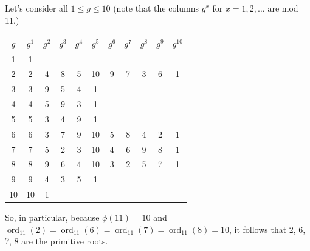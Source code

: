 \documentclass[letterpaper]{article}
\DeclareMathOperator{\ord}{ord}
\begin{document}
\begin{mdframed}
\begin{itemize}
\begin{mdframed}
            \bigskip 

            Let's consider all $1 \leq g \leq 10$ (note that the columns $g^x$ for $x = 1, 2, \hdots$ are mod 11.) 
            \begin{center}
                \begin{tabular}{|c|c c c c c c c c c c|}
                    \hline 
                    $g$ & $g^1$ & $g^2$ & $g^3$ & $g^4$ & $g^5$ & $g^6$ & $g^7$ & $g^8$ & $g^9$ & $g^{10}$ \\ 
                    \hline 
                    1   & 1     &       &       &       &       &       &       &       &       &          \\ 
                    2   & 2     & 4     & 8     & 5     & 10    & 9     & 7     & 3     & 6     & 1        \\ 
                    3   & 3     & 9     & 5     & 4     & 1     &       &       &       &       &          \\ 
                    4   & 4     & 5     & 9     & 3     & 1     &       &       &       &       &          \\ 
                    5   & 5     & 3     & 4     & 9     & 1     &       &       &       &       &          \\ 
                    6   & 6     & 3     & 7     & 9     & 10    & 5     & 8     & 4     & 2     & 1        \\ 
                    7   & 7     & 5     & 2     & 3     & 10    & 4     & 6     & 9     & 8     & 1        \\ 
                    8   & 8     & 9     & 6     & 4     & 10    & 3     & 2     & 5     & 7     & 1        \\ 
                    9   & 9     & 4     & 3     & 5     & 1     &       &       &       &       &          \\ 
                    10  & 10    & 1     &       &       &       &       &       &       &       &          \\ 
                    \hline 
                \end{tabular}
            \end{center}
            So, in particular, because $\phi(11) = 10$ and $\ord_{11}(2) = \ord_{11}(6) = \ord_{11}(7) = \ord_{11}(8) = 10$, it follows that 2, 6, 7, 8 are the primitive roots.
        \end{mdframed}
    \end{itemize}
\end{mdframed}
\end{document}
